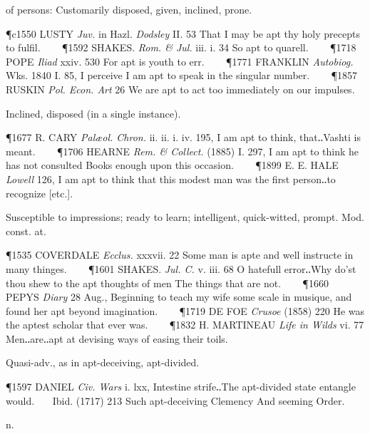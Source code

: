 \begin{description}[wide, labelwidth=!, labelindent=0pt]
\begin{myenumerate}
 of persons: Customarily disposed, given, inclined, prone.

\P c1550 LUSTY  \textit{Juv.} in Hazl. \textit{Dodsley} II. 53 That I may be apt thy holy precepts to fulfil.    
\P 1592 SHAKES.  \textit{Rom. \& Jul.} iii. i. 34 So apt to quarell.    
\P 1718 POPE  \textit{Iliad} xxiv. 530 For apt is youth to err.    
\P 1771 FRANKLIN \textit{Autobiog.} Wks. 1840 I. 85, I perceive I am apt to speak in the singular number.    
\P 1857 RUSKIN  \textit{Pol. Econ. Art} 26 We are apt to act too immediately on our impulses.

 Inclined, disposed (in a single instance).

\P 1677 R. CARY  \textit{Palæol. Chron.} ii. ii. i. iv. 195, I am apt to think, that‥Vashti is meant.    
\P 1706 HEARNE  \textit{Rem. \& Collect.} (1885) I. 297, I am apt to think he has not consulted Books enough upon this occasion.    
\P 1899 E. E. HALE  \textit{Lowell} 126, I am apt to think that this modest man was the first person‥to recognize [etc.].

 Susceptible to impressions; ready to learn; intelligent, quick-witted, prompt. Mod. const. at.

\P 1535 COVERDALE  \textit{Ecclus.} xxxvii. 22 Some man is apte and well instructe in many thinges.    
\P 1601 SHAKES.  \textit{Jul. C.} v. iii. 68 O hatefull error‥Why do'st thou shew to the apt thoughts of men The things that are not.    
\P 1660 PEPYS  \textit{Diary} 28 Aug., Beginning to teach my wife some scale in musique, and found her apt beyond imagination.    
\P 1719 DE FOE  \textit{Crusoe} (1858) 220 He was the aptest scholar that ever was.    
\P 1832 H. MARTINEAU  \textit{Life in Wilds} vi. 77 Men‥are‥apt at devising ways of easing their toils.

\vspace{0.2cm}
\noindent
Quasi-adv., as in apt-deceiving, apt-divided.

\P 1597 DANIEL  \textit{Civ. Wars} i. lxx, Intestine strife‥The apt-divided state entangle would.    Ibid. (1717) 213 Such apt-deceiving Clemency And seeming Order.
\end{myenumerate}


 n.

\noindent {}

\noindent [a. L. arbiter (? f. ar- = ad- to + bētĕre, bītĕre, to go, ‘one who goes to see,’ hence, who looks into or examines) a judge in equity, a supreme ruler. Cf. arbitrator, arbitrer. Arbiter was the orig. L. word, still extant in F. as arbitre; arbitrātor was a later L. n. of agent from arbitrāri to act as arbiter; of this the OF. descendant was arbitreor, -our, by the side of which arbitrateur, -our, was also adopted as a technical term by the jurists. In Eng., arbitrour seems to have been the earliest, then arbitratour, and in 16th c. arbiter from L., though arbitre may well have existed in ME. (The 16th c. spelling arbitour, -or, was, as in ancestor, merely imitative of words properly in -our.)]
\vspace{-0.3cm}


\end{description}

